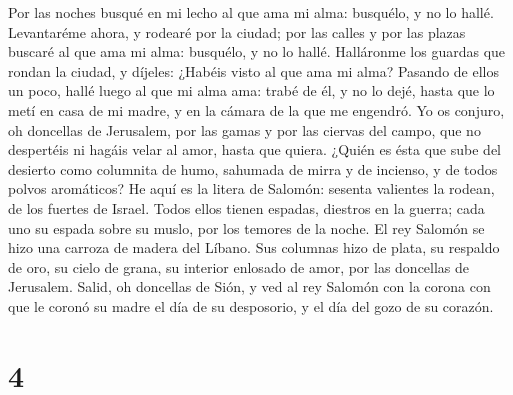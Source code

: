  Por las noches busqué en mi lecho al que ama mi alma:
busquélo, y no lo hallé.  Levantaréme ahora, y rodearé por
la ciudad; por las calles y por las plazas buscaré al que ama mi alma:
busquélo, y no lo hallé.  Halláronme los guardas que rondan
la ciudad, y díjeles: ¿Habéis visto al que ama mi alma? 
Pasando de ellos un poco, hallé luego al que mi alma ama: trabé de él, y
no lo dejé, hasta que lo metí en casa de mi madre, y en la cámara de la
que me engendró.  Yo os conjuro, oh doncellas de Jerusalem,
por las gamas y por las ciervas del campo, que no despertéis ni hagáis
velar al amor, hasta que quiera.  ¿Quién es ésta que sube
del desierto como columnita de humo, sahumada de mirra y de incienso, y
de todos polvos aromáticos?  He aquí es la litera de
Salomón: sesenta valientes la rodean, de los fuertes de Israel.
 Todos ellos tienen espadas, diestros en la guerra; cada uno
su espada sobre su muslo, por los temores de la noche.  El
rey Salomón se hizo una carroza de madera del Líbano.  Sus
columnas hizo de plata, su respaldo de oro, su cielo de grana, su
interior enlosado de amor, por las doncellas de Jerusalem. 
Salid, oh doncellas de Sión, y ved al rey Salomón con la corona con que
le coronó su madre el día de su desposorio, y el día del gozo de su
corazón.

\hypertarget{section-3}{%
\section{4}\label{section-3}}

